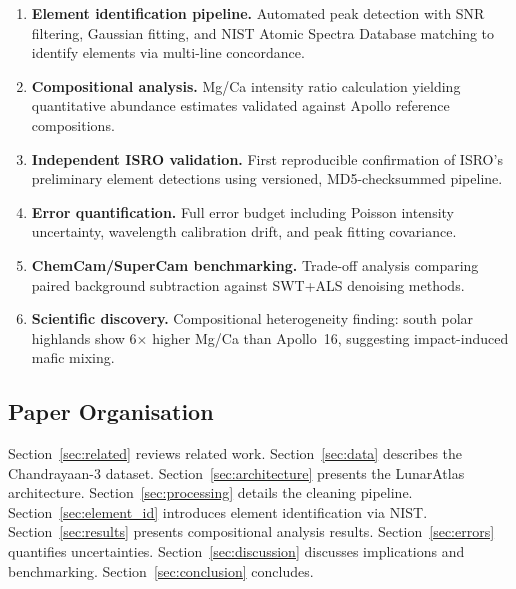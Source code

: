 \documentclass[a4paper,twocolumn,10pt]{article}
\begin{document}
\begin{enumerate}[label=\textbf{(C\arabic*)},leftmargin=*,itemsep=3pt]
  \item \textbf{Element identification pipeline.} Automated peak detection
    with SNR filtering, Gaussian fitting, and NIST Atomic Spectra Database
    matching to identify elements via multi-line concordance.

  \item \textbf{Compositional analysis.} Mg/Ca intensity ratio calculation
    yielding quantitative abundance estimates validated against Apollo
    reference compositions.

  \item \textbf{Independent ISRO validation.} First reproducible
    confirmation of ISRO's preliminary element detections using versioned,
    MD5-checksummed pipeline.

  \item \textbf{Error quantification.} Full error budget including Poisson
    intensity uncertainty, wavelength calibration drift, and peak fitting
    covariance.

  \item \textbf{ChemCam/SuperCam benchmarking.} Trade-off analysis
    comparing paired background subtraction against SWT+ALS denoising
    methods.

  \item \textbf{Scientific discovery.} Compositional heterogeneity finding:
    south polar highlands show 6$\times$ higher Mg/Ca than Apollo~16,
    suggesting impact-induced mafic mixing.
\end{enumerate}

\subsection{Paper Organisation}

Section~\ref{sec:related} reviews related work.
Section~\ref{sec:data} describes the Chandrayaan-3 dataset.
Section~\ref{sec:architecture} presents the LunarAtlas architecture.
Section~\ref{sec:processing} details the cleaning pipeline.
Section~\ref{sec:element_id} introduces element identification via NIST.
Section~\ref{sec:results} presents compositional analysis results.
Section~\ref{sec:errors} quantifies uncertainties.
Section~\ref{sec:discussion} discusses implications and benchmarking.
Section~\ref{sec:conclusion} concludes.

\end{document}
